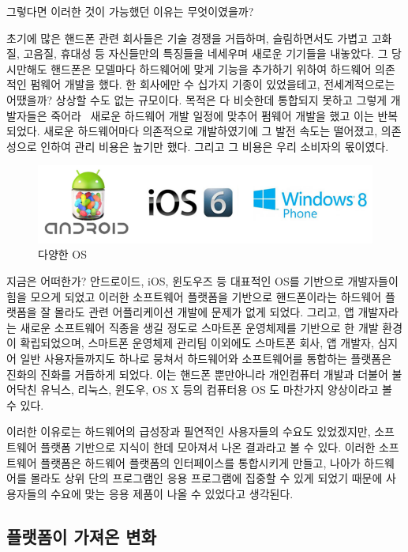 그렇다면 이러한 것이 가능했던 이유는 무엇이였을까? 

초기에 많은 핸드폰 관련 회사들은 기술 경쟁을 거듭하며, 슬림하면서도 가볍고 고화질, 고음질, 휴대성 등 자신들만의 특징들을 네세우며 새로운 기기들을 내놓았다.
그 당시만해도 핸드폰은 모델마다 하드웨어에 맞게 기능을 추가하기 위하여 하드웨어 의존적인 펌웨어 개발을 했다.
한 회사에만 수 십가지 기종이 있었을테고, 전세계적으로는 어땠을까?
상상할 수도 없는 규모이다.
목적은 다 비슷한데 통합되지 못하고 그렇게 개발자들은 죽어라~ 새로운 하드웨어 개발 일정에 맞추어 펌웨어 개발을 했고 이는 반복되었다.
새로운 하드웨어마다 의존적으로 개발하였기에 그 발전 속도는 떨어졌고, 의존성으로 인하여 관리 비용은 높기만 했다.
그리고 그 비용은 우리 소비자의 몫이였다. 

\begin{figure}[h]
\centering\includegraphics[width=\columnwidth]{pictures/chapter1/oss.png}
\caption{다양한 OS}
\end{figure}

지금은 어떠한가? 안드로이드, iOS, 윈도우즈 등 대표적인 OS를 기반으로 개발자들이 힘을 모으게 되었고 이러한 소프트웨어 플랫폼을 기반으로 핸드폰이라는 하드웨어 플랫폼을 잘 몰라도 관련 어플리케이션 개발에 문제가 없게 되었다.
그리고, 앱 개발자라는 새로운 소프트웨어 직종을 생길 정도로 스마트폰 운영체제를 기반으로 한 개발 환경이 확립되었으며, 스마트폰 운영체제 관리팀 이외에도 스마트폰 회사, 앱 개발자, 심지어 일반 사용자들까지도 하나로 뭉쳐서 하드웨어와 소프트웨어를 통합하는 플랫폼은 진화의 진화를 거듭하게 되었다.
이는 핸드폰 뿐만아니라 개인컴퓨터 개발과 더불어 불어닥친 유닉스, 리눅스, 윈도우, OS X 등의 컴퓨터용 OS 도 마찬가지 양상이라고 볼 수 있다.

이러한 이유로는 하드웨어의 급성장과 필연적인 사용자들의 수요도 있었겠지만,  소프트웨어 플랫폼 기반으로 지식이 한데 모아져서 나온 결과라고 볼 수 있다.
이러한 소프트웨어 플랫폼은 하드웨어 플랫폼의 인터페이스를 통합시키게 만들고, 나아가 하드웨어를 몰라도 상위 단의 프로그램인 응용 프로그램에 집중할 수 있게 되었기 때문에 사용자들의 수요에 맞는 응용 제품이 나올 수 있었다고 생각된다. 

\subsection{플랫폼이 가져온 변화}

